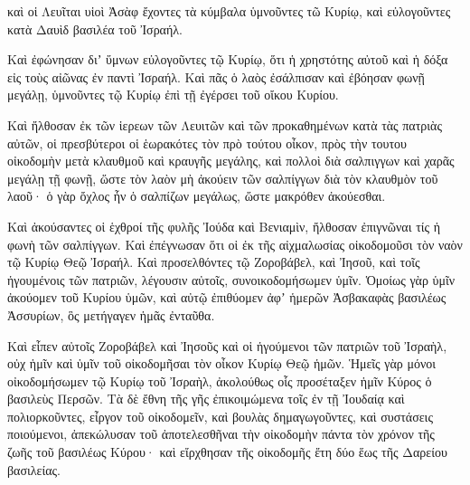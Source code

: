 {καὶ οἱ Λευῖται υἱοὶ Ἀσὰφ ἔχοντες τὰ κύμβαλα ὑμνοῦντες τῶ Κυρίῳ, καὶ εὐλογοῦντες κατὰ Δαυὶδ βασιλέα τοῦ Ἰσραήλ.
\par }{\PP {}Καὶ ἐφώνησαν διʼ ὕμνων εὐλογοῦντες τῷ Κυρίῳ, ὅτι ἡ χρηστότης αὐτοῦ καὶ ἡ δόξα εἰς τοὺς αἰῶνας ἐν παντὶ Ἰσραήλ.
Καὶ πᾶς ὁ λαὸς ἐσάλπισαν καὶ ἐβόησαν φωνῇ μεγάλῃ, ὑμνοῦντες τῷ Κυρίῳ ἐπὶ τῇ ἐγέρσει τοῦ οἴκου Κυρίου.
\par }{\PP {}Καὶ ἤλθοσαν ἐκ τῶν ἱερεων τῶν Λευιτῶν καὶ τῶν προκαθημένων κατὰ τὰς πατριὰς αὐτῶν, οἱ πρεσβύτεροι οἱ ἑωρακότες τὸν πρὸ τούτου οἶκον, πρὸς τὴν τουτου οἰκοδομὴν μετὰ κλαυθμοῦ καὶ κραυγῆς μεγάλης,
καὶ πολλοὶ διὰ σαλπιγγων καὶ χαρᾶς μεγάλῃ τῇ φωνῇ,
ὥστε τὸν λαὸν μὴ ἀκούειν τῶν σαλπίγγων διὰ τὸν κλαυθμὸν τοῦ λαοῦ· ὁ γὰρ ὄχλος ἦν ὁ σαλπίζων μεγάλως, ὥστε μακρόθεν ἀκούεσθαι.
\par }{\PP {}Καὶ ἀκούσαντες οἱ ἑχθροί τῆς φυλῆς Ἰούδα καὶ Βενιαμὶν, ἤλθοσαν ἐπιγνῶναι τίς ἡ φωνὴ τῶν σαλπίγγων.
Καὶ ἐπέγνωσαν ὅτι οἱ ἐκ τῆς αἰχμαλωσίας οἰκοδομοῦσι τὸν ναὸν τῷ Κυρίῳ Θεῷ Ἰσραήλ.
Καὶ προσελθόντες τῷ Ζοροβάβελ, καὶ Ἰησοῦ, καὶ τοῖς ἡγουμένοις τῶν πατριῶν, λέγουσιν αὐτοῖς, συνοικοδομήσωμεν ὑμῖν.
Ὁμοίως γὰρ ὑμῖν ἀκούομεν τοῦ Κυρίου ὑμῶν, καὶ αὐτῷ ἐπιθύομεν ἀφʼ ἡμερῶν Ἀσβακαφὰς βασιλέως Ἀσσυρίων, ὃς μετήγαγεν ἡμᾶς ἐνταῦθα.
\par }{\PP {}Καὶ εἶπεν αὐτοῖς Ζοροβάβελ καὶ Ἰησοῦς καὶ οἱ ἡγούμενοι τῶν πατριῶν τοῦ Ἰσραὴλ, οὐχ ἡμῖν καὶ ὑμῖν τοῦ οἰκοδομῆσαι τὸν οἶκον Κυρίῳ Θεῷ ἡμῶν.
Ἡμεῖς γὰρ μόνοι οἰκοδομήσωμεν τῷ Κυρίῳ τοῦ Ἰσραὴλ, ἀκολούθως οἷς προσέταξεν ἡμῖν Κύρος ὁ βασιλεὺς Περσῶν.
Τὰ δὲ ἔθνη τῆς γῆς ἐπικοιμώμενα τοῖς ἐν τῇ Ἰουδαίᾳ καὶ πολιορκοῦντες, εἶργον τοῦ οἰκοδομεῖν,
καὶ βουλὰς δημαγωγοῦντες, καὶ συστάσεις ποιούμενοι, ἀπεκώλυσαν τοῦ ἀποτελεσθῆναι τὴν οἰκοδομὴν πάντα τὸν χρόνον τῆς ζωῆς τοῦ βασιλέως Κύρου· καὶ εἴρχθησαν τῆς οἰκοδομῆς ἔτη δύο ἕως τῆς Δαρείου βασιλείας.

}
